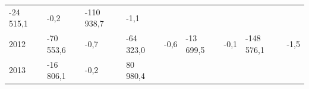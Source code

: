 \begin{longtable}[]{@{}lllllllll@{}}
\begin{minipage}[t]{0.12\columnwidth}
-24 515,1\strut
\end{minipage} & \begin{minipage}[t]{0.06\columnwidth}\raggedright
-0,2\strut
\end{minipage} & \begin{minipage}[t]{0.09\columnwidth}\raggedright
-110 938,7\strut
\end{minipage} & \begin{minipage}[t]{0.06\columnwidth}\raggedright
-1,1\strut
\end{minipage}\tabularnewline
\begin{minipage}[t]{0.05\columnwidth}\raggedright
2012\strut
\end{minipage} & \begin{minipage}[t]{0.10\columnwidth}\raggedright
-70 553,6\strut
\end{minipage} & \begin{minipage}[t]{0.06\columnwidth}\raggedright
-0,7\strut
\end{minipage} & \begin{minipage}[t]{0.16\columnwidth}\raggedright
-64 323,0\strut
\end{minipage} & \begin{minipage}[t]{0.06\columnwidth}\raggedright
-0,6\strut
\end{minipage} & \begin{minipage}[t]{0.12\columnwidth}\raggedright
-13 699,5\strut
\end{minipage} & \begin{minipage}[t]{0.06\columnwidth}\raggedright
-0,1\strut
\end{minipage} & \begin{minipage}[t]{0.09\columnwidth}\raggedright
-148 576,1\strut
\end{minipage} & \begin{minipage}[t]{0.06\columnwidth}\raggedright
-1,5\strut
\end{minipage}\tabularnewline
\begin{minipage}[t]{0.05\columnwidth}\raggedright
2013\strut
\end{minipage} & \begin{minipage}[t]{0.10\columnwidth}\raggedright
-16 806,1\strut
\end{minipage} & \begin{minipage}[t]{0.06\columnwidth}\raggedright
-0,2\strut
\end{minipage} & \begin{minipage}[t]{0.16\columnwidth}\raggedright
80 980,4\strut

\end{minipage}
\end{longtable}
